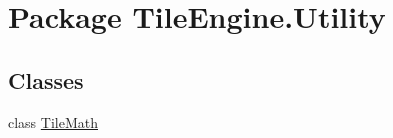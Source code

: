 \hypertarget{namespace_tile_engine_1_1_utility}{\section{Package Tile\-Engine.\-Utility}
\label{namespace_tile_engine_1_1_utility}
}
\subsection*{Classes}
\begin{DoxyCompactItemize}
\item 
class \hyperlink{class_tile_engine_1_1_utility_1_1_tile_math}{Tile\-Math}
\end{DoxyCompactItemize}
